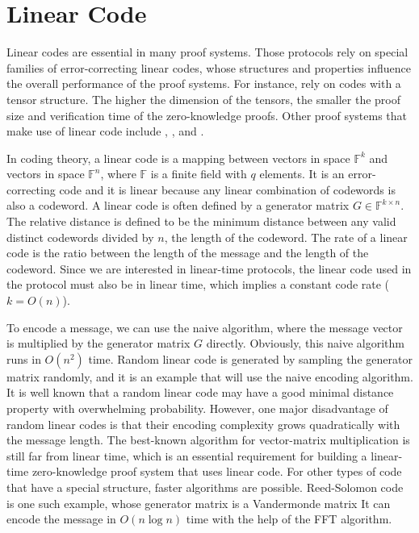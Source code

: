 \section{Linear Code}

Linear codes are essential in many proof systems. Those protocols rely on special families of error-correcting linear codes, whose structures and properties influence the overall performance of the proof systems. For instance, \cite{brakedown} \cite{cryptoeprint:2020/1426} \cite{BCL22} rely on codes with a tensor structure. The higher the dimension of the tensors, the smaller the proof size and verification time of the zero-knowledge proofs. Other proof systems that make use of linear code include \cite{DBLP:conf/coco/BordageLNR22}, \cite{DBLP:conf/icalp/Ben-SassonBHR18}, \cite{DBLP:conf/ccs/AmesHIV17} and \cite{DBLP:conf/crypto/Ben-SassonBHR19}.


In coding theory, a linear code is a mapping between vectors in space $\mathbb{F}^k$ and vectors in space $\mathbb{F}^n$, where $\mathbb{F}$ is a finite field with $q$ elements. It is an error-correcting code and it is linear because any linear combination of codewords is also a codeword. A linear code is often defined by a generator matrix $G \in \mathbb{F}^{k \times n}$. The relative distance is defined to be the minimum distance between any valid distinct codewords divided by $n$, the length of the codeword. The rate of a linear code is the ratio between the length of the message and the length of the codeword. Since we are interested in linear-time protocols, the linear code used in the protocol must also be in linear time, which implies a constant code rate ($k = O(n)$).

To encode a message, we can use the naive algorithm, where the message vector is multiplied by the generator matrix $G$ directly. Obviously, this naive algorithm runs in $O(n^2)$ time. 
Random linear code is generated by sampling the generator matrix randomly, and it is an example that will use the naive encoding algorithm. It is well known that a random linear code may have a good minimal distance property with overwhelming probability. However, one major disadvantage of random linear codes is that their encoding complexity grows quadratically with the message length. The best-known algorithm for vector-matrix multiplication is still far from linear time, which is an essential requirement for building a linear-time zero-knowledge proof system that uses linear code. For other types of code that have a special structure, faster algorithms are possible. Reed-Solomon code is one such example, whose generator matrix is a Vandermonde matrix It can encode the message in $O(n \log n)$ time with the help of the FFT algorithm.



